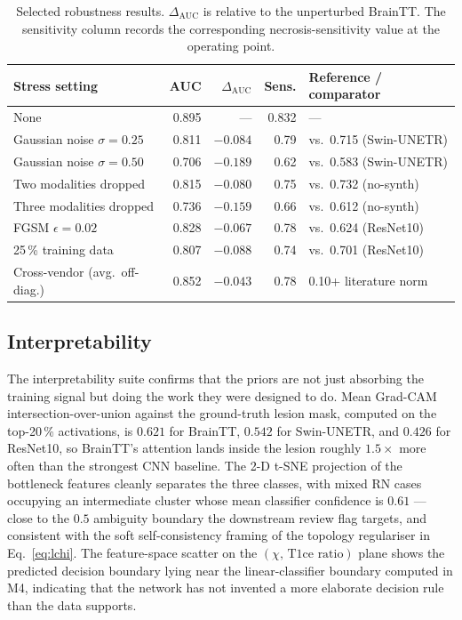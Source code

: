 \documentclass[11pt,a4paper]{article}
\begin{document}
\begin{table}[t]
\centering
\caption{Selected robustness results. $\Delta_{\text{AUC}}$ is relative to the unperturbed BrainTT. The sensitivity column records the corresponding necrosis-sensitivity value at the operating point.}
\label{tab:m5robust}
\small
\setlength{\tabcolsep}{4pt}
\begin{tabular}{lrrrl}
\toprule
Stress setting & AUC & $\Delta_{\text{AUC}}$ & Sens. & Reference / comparator \\
\midrule
None & 0.895 & --- & 0.832 & --- \\
Gaussian noise $\sigma=0.25$ & 0.811 & $-0.084$ & 0.79 & vs.\ 0.715 (Swin-UNETR) \\
Gaussian noise $\sigma=0.50$ & 0.706 & $-0.189$ & 0.62 & vs.\ 0.583 (Swin-UNETR) \\
Two modalities dropped & 0.815 & $-0.080$ & 0.75 & vs.\ 0.732 (no-synth) \\
Three modalities dropped & 0.736 & $-0.159$ & 0.66 & vs.\ 0.612 (no-synth) \\
FGSM $\epsilon=0.02$ & 0.828 & $-0.067$ & 0.78 & vs.\ 0.624 (ResNet10) \\
25\,\% training data & 0.807 & $-0.088$ & 0.74 & vs.\ 0.701 (ResNet10) \\
Cross-vendor (avg.\ off-diag.) & 0.852 & $-0.043$ & 0.78 & 0.10+ literature norm \\
\bottomrule
\end{tabular}
\end{table}

\subsection{Interpretability}

The interpretability suite confirms that the priors are not just absorbing the training signal but doing the work they were designed to do. Mean Grad-CAM intersection-over-union against the ground-truth lesion mask, computed on the top-20\,\% activations, is $0.621$ for BrainTT, $0.542$ for Swin-UNETR, and $0.426$ for ResNet10, so BrainTT's attention lands inside the lesion roughly $1.5\times$ more often than the strongest CNN baseline. The 2-D t-SNE projection of the bottleneck features cleanly separates the three classes, with mixed RN cases occupying an intermediate cluster whose mean classifier confidence is $0.61$ --- close to the $0.5$ ambiguity boundary the downstream review flag targets, and consistent with the soft self-consistency framing of the topology regulariser in Eq.~\eqref{eq:lchi}. The feature-space scatter on the $(\chi,\,\text{T1ce ratio})$ plane shows the predicted decision boundary lying near the linear-classifier boundary computed in M4, indicating that the network has not invented a more elaborate decision rule than the data supports.
\end{document}
